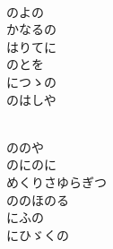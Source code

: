 \documentclass[10pt,b5j]{tarticle} %
\begin{document}
\vspace{1.5em} %
\newcommand{\linespace}{0.5em} %
\newcommand{\blocksize}{0.5\hsize} %
\newcommand{\itemmargin}{3em} %
\begin{enumerate} %
    \setlength{\itemindent}{\itemmargin} %
    \begin{minipage}[c]{\blocksize}
    
        \vspace{\linespace}
        \item~\\
        のよの\\
        かなるの\\
        はりてに\\
        のとを\\
        につゝの\\
        のはしや
        
    \end{minipage}
    \begin{minipage}[c]{\blocksize}
        
        \vspace{\linespace}
        \item~\\
        ののや\\
        のにのに\\
        めくりさゆらぎつ\\
        ののほのる\\
        にふの\\
        にひゞくの
        
    \end{minipage}
    \begin{minipage}[c]{\blocksize}
        

\end{minipage}
\end{enumerate}
\end{document}

